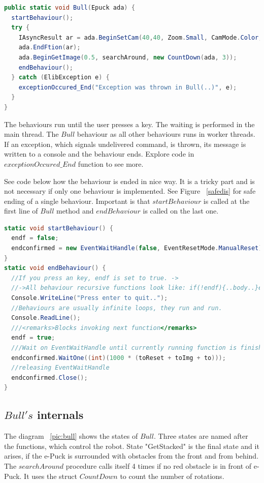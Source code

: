 \begin{lstlisting}[language=cs]
public static void Bull(Epuck ada) {
  startBehaviour();
  try {
    IAsyncResult ar = ada.BeginSetCam(40,40, Zoom.Small, CamMode.Color, toSetCam, null, null);
    ada.EndFtion(ar);
    ada.BeginGetImage(0.5, searchAround, new CountDown(ada, 3));
    endBehaviour();
  } catch (ElibException e) {
    exceptionOccured_End("Exception was thrown in Bull(..)", e);
  }
}
\end{lstlisting}
  
  The behaviours run until the user presses a key. The waiting is performed in the main thread. 
  The $Bull$ behaviour as all other behaviours runs in worker threads.
  If an exception, which signals undelivered command, is thrown, 
  its message is written to a console and the behaviour ends. 
  Explore code in $exceptionOccured\_End$ function to see more.

  See code below how the behaviour is ended in nice way. 
  It is a tricky part and is not necessary if only one behaviour is implemented. See Figure ~\ref{safedis}
  for safe ending of a single behaviour.
  Important is that $startBehaviour$ is called at the first line of $Bull$ method 
  and $endBehaviour$ is called on the last one.
\begin{lstlisting}[language=cs]
static void startBehaviour() {
  endf = false;
  endconfirmed = new EventWaitHandle(false, EventResetMode.ManualReset);
}
static void endBehaviour() {        
  //If you press an key, endf is set to true. ->
  //->All behaviour recursive functions look like: if(!endf){..body..}else endconfirmed.Set();
  Console.WriteLine("Press enter to quit..");
  //Behaviours are usually infinite loops, they run and run.
  Console.ReadLine();
  ///<remarks>Blocks invoking next function</remarks>
  endf = true;
  ///Wait on EventWaitHandle until currently running function is finished.
  endconfirmed.WaitOne((int)(1000 * (toReset + toImg + to)));
  //releasing EventWaitHandle
  endconfirmed.Close();
}
\end{lstlisting}

\subsection{$Bull's$ internals} \label{bull}
  The diagram ~\ref{pic:bull} shows the states of $Bull$.
  Three states are named after the functions, which control the robot. State "GetStacked" 
  is the final state and it arises, if the e-Puck is surrounded with obstacles from the front and from behind.
  The $searchAround$ procedure calls itself 4 times if no red obstacle is in front of e-Puck.
  It uses the struct $CountDown$ to count the number of rotations.

